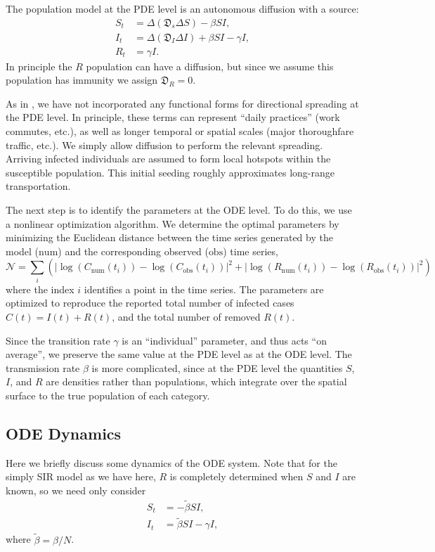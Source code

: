 \documentclass[11pt]{article}
\newcommand{\N}{\mathcal{N}}
\newcommand{\num}{\text{num}}
\newcommand{\obs}{\text{obs}}
\newcommand{\D}{\mathfrak{D}}
\begin{document}
The population model at the PDE level is an autonomous diffusion with a source:
\begin{align}
	S_t	&=	\Delta (\D_s \Delta S) - \beta SI,	\\
	I_t	&=	\Delta (\D_I \Delta I) + \beta SI - \gamma I,	\\
	R_t	&=	\gamma I.
\end{align}
In principle the $R$ population can have a diffusion, but since we assume this population has immunity we assign $\D_R = 0$.

As in \cite{Kevrekidis_2021}, we have not incorporated any functional forms for directional spreading at the PDE level.
In principle, these terms can represent ``daily practices'' (work commutes, etc.), as well as longer temporal or spatial scales (major thoroughfare traffic, etc.).
We simply allow diffusion to perform the relevant spreading.
Arriving infected individuals are assumed to form local hotspots within the susceptible population.
This initial seeding roughly approximates long-range transportation.

The next step is to identify the parameters at the ODE level.
To do this, we use a nonlinear optimization algorithm.
We determine the optimal parameters by minimizing the Euclidean distance between the time series generated by the model ($\num$) and the corresponding observed ($\obs$) time series,
\begin{equation}
	\N = \sum_i \left( \left| \log(C_\num (t_i)) - \log(C_\obs (t_i)) \right|^2 + \left| \log(R_\num (t_i)) - \log(R_\obs (t_i)) \right|^2 \right)
\end{equation}
where the index $i$ identifies a point in the time series.
The parameters are optimized to reproduce the reported total number of infected cases $C(t) = I(t) + R(t)$, and the total number of removed $R(t)$.

Since the transition rate $\gamma$ is an ``individual'' parameter, and thus acts ``on average'', we preserve the same value at the PDE level as at the ODE level.
The transmission rate $\beta$ is more complicated, since at the PDE level the quantities $S$, $I$, and $R$ are densities rather than populations,
which integrate over the spatial surface to the true population of each category.

\subsection{ODE Dynamics}
Here we briefly discuss some dynamics of the ODE system.
Note that for the simply SIR model as we have here, $R$ is completely determined when $S$ and $I$ are known, so we need only consider
\begin{align*}
	S_t	&=	- \tilde{\beta} SI, \\
	I_t	&=	\tilde{\beta} SI - \gamma I,
\end{align*}
where $\tilde{\beta} = \beta / N$.
\end{document}
